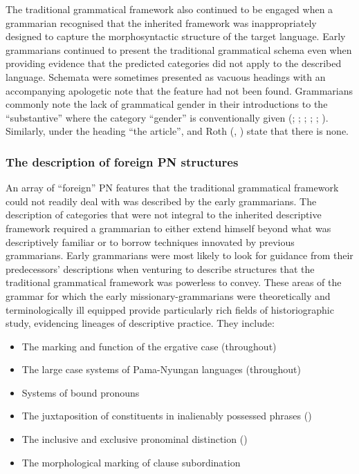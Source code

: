 The traditional grammatical framework also continued to be engaged when a grammarian recognised that the inherited framework was inappropriately designed to capture the morphosyntactic structure of the target language. Early grammarians continued to present the traditional grammatical schema even when providing evidence that the predicted categories did not apply to the described language. Schemata were sometimes presented as vacuous headings with an accompanying apologetic note that the feature had not been found. Grammarians commonly note the lack of grammatical gender in their introductions to the “substantive” where the category “gender” is conventionally given (\citealt[4]{teichelmann_outlines_1840}; \citealt[10]{meyer_vocabulary_1843}; \citealt[2]{schurmann_vocabulary_1844}; \citealt[7]{taplin_grammar_1880}; \citealt[2]{kempe_grammar_1891}; \citealt{Strehlow_n.d}). Similarly, under the heading “the article”, \citet{symmons_grammatical_1841} and Roth (\citeyear{roth_ethnological_1897}, \citeyear{roth_structure_1901}) state that there is none.

\subsubsection{The description of foreign PN structures}
\label{sec:key:2.3.1.1}

An array of “foreign” PN features that the traditional grammatical framework could not readily deal with was described by the early grammarians. The description of categories that were not integral to the inherited descriptive framework required a grammarian to either extend himself beyond what was descriptively familiar or to borrow techniques innovated by previous grammarians. Early grammarians were most likely to look for guidance from their predecessors' descriptions when venturing to describe structures that the traditional grammatical framework was powerless to convey. These areas of the grammar for which the early missionary-grammarians were theoretically and terminologically ill equipped provide particularly rich fields of historiographic study, evidencing lineages of descriptive practice. They include: 

\begin{itemize}
    \item The marking and function of the ergative case (throughout)
    \item The large case systems of Pama-Nyungan languages (throughout)
    \item Systems of bound pronouns 
    \item The juxtaposition of constituents in inalienably possessed phrases ()
    \item The inclusive and exclusive pronominal distinction (\citealt{Stockigt2017})
    \item The morphological marking of clause subordination
\end{itemize}
    
